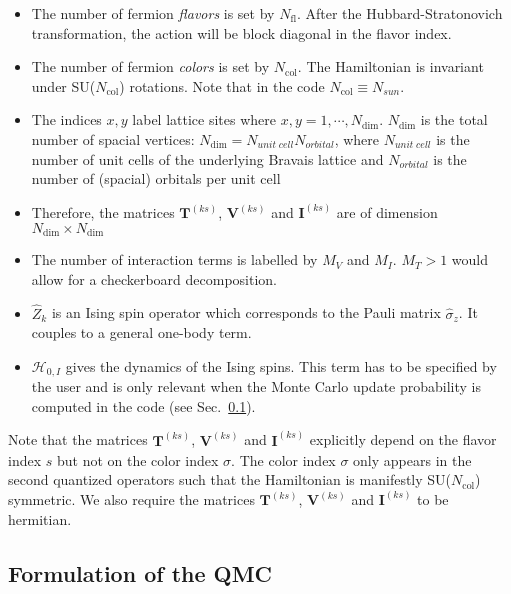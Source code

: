 \begin{itemize}
\item The number of fermion \textit{flavors} is set by $N_{\mathrm{fl}}$.  After the Hubbard-Stratonovich transformation, the action will be block diagonal in the flavor index. 
\item The number of fermion \textit{colors} is set by $N_{\mathrm{col}}$.    The Hamiltonian is invariant under  SU($N_{\mathrm{col}}$)  rotations. Note that  in the code $ N_{\mathrm{col}} \equiv N_{sun} $. 
\item The indices $x,y$ label lattice sites where $x,y=1,\cdots, N_{\mathrm{dim}}$. 
$N_{\mathrm{dim}}$ is the total number of spacial vertices: $N_{\mathrm{dim}}=N_{unit\;cell} N_{orbital}$, where $N_{unit\;cell}$ is the number of unit cells of the underlying Bravais lattice and $N_{orbital}$ is the number of (spacial) orbitals per unit cell  
\item Therefore, the  matrices $\bm{T}^{(k s)}$, $\bm{V}^{(ks)}$  and $\bm{I}^{(ks)}$ are  of dimension $N_{\mathrm{dim}}\times N_{\mathrm{dim}}$
\item The number of interaction terms  is labelled by $M_V$   and $M_I$.   $M_T> 1 $ would allow for a checkerboard decomposition. 
\item $\hat{Z}_k$ is an Ising spin operator which corresponds to the Pauli matrix $\hat{\sigma}_{z}$. It couples to a general one-body term. 
\item  $\mathcal{H}_{0,I}$  gives the dynamics of the Ising spins. 
This term has to be specified by the user and is only relevant when the Monte Carlo update probability is computed in the code (see Sec.~\ref{}).
\end{itemize}
Note that the matrices  $\bm{T}^{(ks)}$,  $\bm{V}^{(ks)}$ and  $\bm{I}^{(ks)}$ explicitly depend on the flavor index $s$ but not on the color index $\sigma$. 
The color index $\sigma$ only appears in  the  second quantized operators such that the Hamiltonian is manifestly SU($N_{\mathrm{col}}$)    symmetric.  We also require
the matrices $\bm{T}^{(ks)}$,  $\bm{V}^{(ks)}$ and  $\bm{I}^{(ks)}$  to be  hermitian.


\subsection{Formulation of the QMC}  
